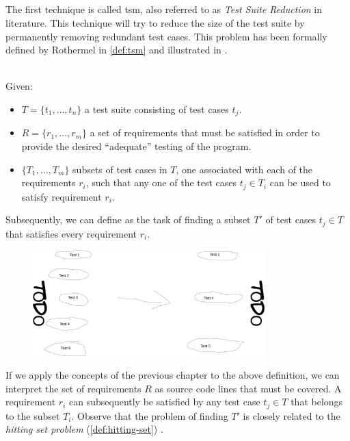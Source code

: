 
\subsection{\tsm{}}
\label{ssec:tsm}
The first technique is called \acrfull{tsm}, also referred to as \emph{Test Suite Reduction} in literature. This technique will try to reduce the size of the test suite by permanently removing redundant test cases. This problem has been formally defined by Rothermel \cite{10.1002/stv.430} in \cref{def:tsm} and illustrated in .

\begin{definition}[\tsm{}]
\label{def:tsm}
\mbox{}\\Given:
\begin{itemize}
	\item $T = \{t_1, \dots, t_n\}$ a test suite consisting of test cases $t_j$.
	\item $R = \{r_1, \dots, r_m\}$ a set of requirements that must be satisfied in order to provide the desired ``adequate'' testing of the program.
	\item $\{T_1, \dots, T_m\}$ subsets of test cases in $T$, one associated with each of the requirements $r_i$, such that any one of the test cases $t_j \in T_i$ can be used to satisfy requirement $r_i$.
\end{itemize}

\noindent Subsequently, we can define \tsm{} as the task of finding a subset $T'$ of test cases $t_j \in T$ that satisfies every requirement $r_i$.
\end{definition}


\begin{figure}[htbp!]
	\centering
	\includegraphics[width=0.8\textwidth]{assets/images/approach-tsm.pdf}
	\caption{\tsm{}}
	\label{fig:tsm}
\end{figure}

\noindent If we apply the concepts of the previous chapter to the above definition, we can interpret the set of requirements $R$ as source code lines that must be covered. A requirement $r_i$ can subsequently be satisfied by any test case $t_j \in T$ that belongs to the subset $T_i$. Observe that the problem of finding $T'$ is closely related to the \emph{hitting set problem} (\cref{def:hitting-set}) \cite{10.1002/stv.430}.


